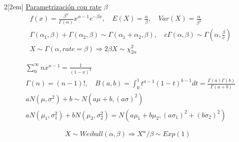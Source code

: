\documentclass[leqno]{article}
\begin{document}
\begin{multicols}{2}[\columnsep2em]
\underline{Parametrización con rate} $\beta$
\begin{align*}
& f(x) = \frac{\beta^\alpha}{\Gamma(\alpha)} x^{\alpha-1} e^{-\beta x}, \quad 
E(X) = \frac{\alpha}{\beta} , \quad Var(X) = \frac{\alpha}{\beta^2} \\
& \Gamma (\alpha_1, \beta) + \Gamma (\alpha_2, \beta) \sim \Gamma (\alpha_1+\alpha_2, \beta), \quad c\Gamma (\alpha, \beta) \sim \Gamma (\alpha, \frac{\beta}{c}) \\
& X \sim \Gamma(\alpha, rate=\beta) \Rightarrow 2\beta X \sim \chi^2_{2\alpha}
\end{align*}

\begin{align*}
  &\sum_{0}^\infty nx^{n-1} = \frac{1}{(1-x)^2} \\
  &\Gamma (n) = (n-1)!, \quad B(a, b) = \int_0^1 t^{a-1}(1-t)^{b-1}dt = \frac{\Gamma (a)\Gamma (b)}{\Gamma (a+b)}\\
  &aN(\mu, \sigma ^2) + b \sim N(a\mu+b, (a\sigma )^2) \\
  &aN(\mu_1, \sigma_1^2) + bN(\mu_2, \sigma _2^2) = N(a\mu_1+b\mu_2, (a\sigma_1)^2+(b\sigma _2)^2)
\end{align*}

\[
X \sim Weibull(\alpha, \beta) \Rightarrow X^\alpha/\beta \sim Exp(1)
\]



\end{multicols}
\end{document}
